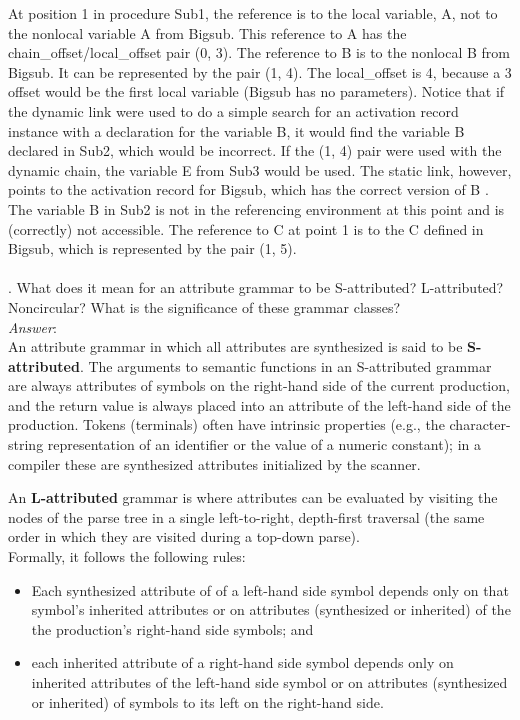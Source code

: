 \documentclass[a4paper,12pt]{article}
\begin{document}
     At position 1 in procedure Sub1, the reference is to the local variable,
A, not to the nonlocal variable A from Bigsub. This reference to A has the
chain\_offset/local\_offset pair (0, 3). The reference to B is to the nonlocal B
from Bigsub. It can be represented by the pair (1, 4). The local\_offset is 4,
because a 3 offset would be the first local variable (Bigsub has no parameters). Notice that if the dynamic link were used to do a simple search for
an activation record instance with a declaration for the variable B, it would
find the variable B declared in Sub2, which would be incorrect. If the (1, 4)
pair were used with the dynamic chain, the variable E from Sub3 would be
used. The static link, however, points to the activation record for Bigsub,
which has the correct version of B . The variable B in Sub2 is not in the
referencing environment at this point and is (correctly) not accessible. The
reference to C at point 1 is to the C defined in Bigsub, which is represented
by the pair (1, 5).\\
\\
. What does it mean for an attribute grammar to be S-attributed? L-attributed? Noncircular? What is the significance of these grammar classes?
\\
\emph{Answer}:\\
   An attribute grammar in which all attributes are synthesized is said to be \textbf{S-attributed}. The arguments to semantic functions in an S-attributed grammar are always attributes of symbols on the right-hand side of the current production, and the return value is always placed into an attribute of the left-hand side of the production. Tokens (terminals) often have intrinsic properties (e.g.,
the character-string representation of an identifier or the value of a numeric constant); in a compiler these are synthesized attributes initialized by the scanner.

An \textbf{L-attributed} grammar is where attributes can be evaluated by visiting the nodes of the parse tree in a single left-to-right, depth-first traversal (the same order in which they are visited during a top-down parse). \\Formally, it follows the following rules:\\
\begin{itemize}
\item Each synthesized attribute of of a left-hand side symbol depends only on that symbol's inherited attributes or on attributes (synthesized or inherited) of the the production's right-hand side symbols; and
\item each inherited attribute of a right-hand side symbol depends only on inherited attributes of the left-hand side symbol or on attributes (synthesized or inherited) of symbols to its left on the right-hand side.
\end{itemize}
\end{document}
